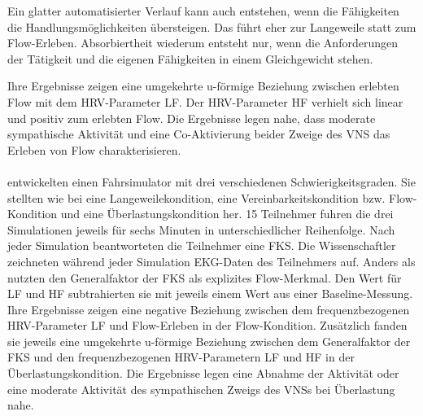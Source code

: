 Ein glatter automatisierter Verlauf kann auch entstehen, wenn die Fähigkeiten die Handlungsmöglichkeiten übersteigen. Das führt eher zur Langeweile statt zum Flow-Erleben. Absorbiertheit wiederum entsteht nur, wenn die Anforderungen der Tätigkeit und die eigenen Fähigkeiten in einem Gleichgewicht stehen.

Ihre Ergebnisse zeigen eine umgekehrte u-förmige Beziehung zwischen erlebten Flow mit dem \ac{HRV}-Parameter \acs{LF}. Der \ac{HRV}-Parameter \acs{HF} verhielt sich linear und positiv zum erlebten Flow. Die Ergebnisse legen nahe, dass moderate sympathische Aktivität und eine Co-Aktivierung beider Zweige des \acs{VNS} das Erleben von Flow charakterisieren.

\paragraph{\citet{Tozman2015}} 

\label{par:tozman2015}

entwickelten einen Fahrsimulator mit drei verschiedenen Schwierigkeitsgraden. Sie stellten wie bei \citet{Keller2011} eine Langeweilekondition, eine Vereinbarkeitskondition bzw. Flow-Kondition und eine Überlastungskondition her. 15 Teilnehmer fuhren die drei Simulationen jeweils für sechs Minuten in unterschiedlicher Reihenfolge. Nach jeder Simulation beantworteten die Teilnehmer eine \ac{FKS}. Die Wissenschaftler zeichneten während jeder Simulation \ac{EKG}-Daten des Teilnehmers auf. Anders als \citet{Peifer2014} nutzten \citet{Tozman2015} den Generalfaktor der \ac{FKS} als explizites Flow-Merkmal. Den Wert für \acs{LF} und \acs{HF} subtrahierten sie mit jeweils einem Wert aus einer Baseline-Messung. Ihre Ergebnisse zeigen eine negative Beziehung zwischen dem frequenzbezogenen \ac{HRV}-Parameter \acs{LF} und Flow-Erleben in der Flow-Kondition. Zusätzlich fanden sie jeweils eine umgekehrte u-förmige Beziehung zwischen dem Generalfaktor der \ac{FKS} und den frequenzbezogenen \ac{HRV}-Parametern \acs{LF} und \acs{HF} in der Überlastungskondition. Die Ergebnisse legen eine Abnahme der Aktivität oder eine moderate Aktivität des sympathischen Zweigs des \acs{VNS}s bei Überlastung nahe.

\paragraph{\citet{Harmat2015}} 

\label{par:harmat2015}

